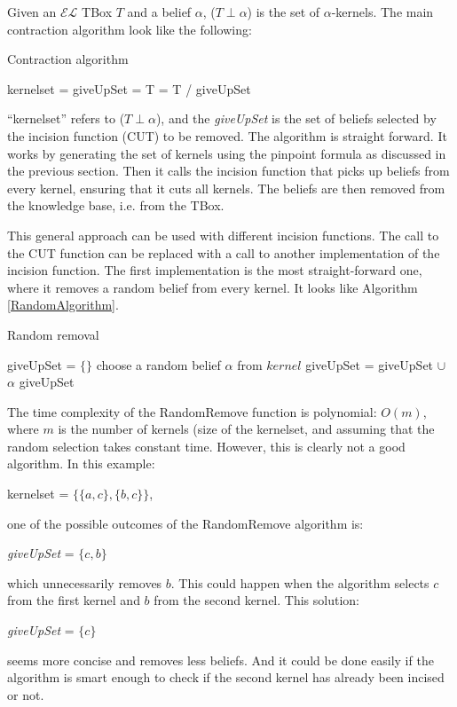 Given an $\mathcal{EL}$ TBox $T$ and a belief $\alpha$, ($T \perp \alpha$) is the set of $\alpha$-kernels. The main contraction algorithm look like the following:

\begin{algorithm}
\caption{Contraction algorithm}
\label{MainAlgorithm}
\begin{algorithmic}[1]
\State kernelset = 
\State giveUpSet = 
\State T = T / giveUpSet
\EndProcedure
\end{algorithmic}
\end{algorithm}

``kernelset'' refers to ($T \perp \alpha$), and the \textit{giveUpSet} is the set of beliefs selected by the incision function (CUT) to be removed. The algorithm is straight forward. It works by generating the set of kernels using the pinpoint formula as discussed in the previous section. Then it calls the incision function that picks up beliefs from every kernel, ensuring that it cuts all kernels. The beliefs are then removed from the knowledge base, i.e. from the TBox.

This general approach can be used with different incision functions. The call to the CUT function can be replaced with a call to another implementation of the incision function. The first implementation is the most straight-forward one, where it removes a random belief from every kernel. It looks like Algorithm \ref{RandomAlgorithm}.

\begin{algorithm}
\caption{Random removal}
\label{RandomAlgorithm}
\begin{algorithmic}[1]
\State giveUpSet = $\lbrace \rbrace$
\State choose a random belief $\alpha$ from $kernel$
\State giveUpSet = giveUpSet $\cup$ $\alpha$
\EndFor \State
\Return giveUpSet
\EndFunction
\end{algorithmic}
\end{algorithm}

The time complexity of the RandomRemove function is polynomial: $O(m)$, where $m$ is the number of kernels (size of the kernelset, and assuming that the random selection takes constant time. However, this is clearly not a good algorithm. In this example:
\begin{center}
kernelset = $\lbrace \lbrace a, c \rbrace, \lbrace b, c \rbrace \rbrace$, 
\end{center}
one of the possible outcomes of the RandomRemove algorithm is:
\begin{center}
\textit{giveUpSet} = $\lbrace c, b \rbrace$
\end{center}
which unnecessarily removes $b$. This could happen when the algorithm selects $c$ from the first kernel and $b$ from the second kernel. This solution:
\begin{center}
\textit{giveUpSet} = $\lbrace c \rbrace$
\end{center}
seems more concise and removes less beliefs. And it could be done easily if the algorithm is smart enough to check if the second kernel has already been incised or not. 

